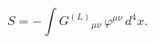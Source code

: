 \begin{equation}
S=-\int G^{(L)}{}_{\mu \nu }\,\varphi ^{\mu \nu }\,d^{4}x .
\label{0181bis}
\end{equation}

